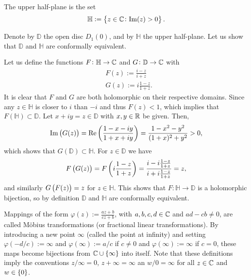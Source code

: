 \documentclass[11pt,a4paper]{article}
\begin{document}
\begin{definition}
  The upper half-plane is the set
  \[
    \mathbb H := \left\{z \in \mathbb{C} \colon \mathrm{Im}(z) > 0\right\}.
  \]
\end{definition}

\begin{example}
  Denote by $\mathbb D$ the open disc $D_1(0)$, and by $\mathbb H$ the upper
  half-plane.
  Let us show that $\mathbb D$ and $\mathbb H$ are conformally equivalent.

  Let us define the functions $F \colon \mathbb H \to \mathbb{C}$ and
  $G \colon \mathbb D \to \mathbb{C}$ with
  \begin{align*}
    &F(z) := \frac{i - z}{i + z} \\
    &G(z) := i \frac{1 - z}{1 + z}.
  \end{align*}
  It is clear that $F$ and $G$ are both holomorphic on their respective domains.
  Since any $z \in \mathbb H$ is closer to $i$ than $-i$ and thus $F(z) < 1$,
  which implies that $F(\mathbb H) \subset \mathbb D$.
  Let $x + iy = z \in \mathbb D$ with $x,y \in \mathbb{R}$ be given.
  Then,
  \[
    \Im\del{G(z)} =
    \Re\del{\frac{1 - x - iy}{1 + x + iy}} =
    \frac{1 - x^2 - y^2}{(1 + x)^2 + y^2} > 0,
  \]
  which shows that $G(\mathbb D) \subset \mathbb H$.
  For $z \in \mathbb D$ we have
  \[
    F\del{G(z)} =
    F\del{i \frac{1 - z}{1 + z}} =
    \frac{i - i \frac{1 - z}{1 + z}}{i + i \frac{1 - z}{1 + z}} = z,
  \]
  and similarly $G\del{F(z)} = z$ for $z \in \mathbb H$.
  This shows that $F \colon \mathbb H \to \mathbb D$ is a holomorphic bijection,
  so by definition $\mathbb D$ and $\mathbb H$ are conformally equivalent.
\end{example}

\begin{remark}
  Mappings of the form $\varphi(z) := \frac{az + b}{cz + b}$,
  with $a,b,c,d \in \mathbb{C}$ and $ad - cb \neq 0$,
  are called M\"obius transformations (or fractional linear transformations).
  By introducing a new point $\infty$ (called the point at infinity)
  and setting $\varphi(-d / c) := \infty$ and $\varphi(\infty) := a / c$
  if $c \neq 0$ and $\varphi(\infty) := \infty$ if $c = 0$,
  these maps become bijections from $\mathbb{C} \cup \left\{\infty\right\}$ into itself.
  Note that these definitions imply the conventions $z / \infty = 0$,
  $z + \infty  = \infty$ an $w / 0 = \infty$ for all $z \in \mathbb{C}$ and
  $w \in \left\{0\right\}$.
\end{remark}
\end{document}
